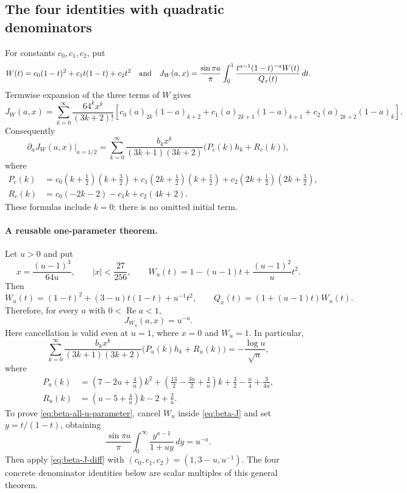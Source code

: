 \documentclass[11pt,a4paper]{article}
\theoremstyle{remark}\newtheorem{remark}[theorem]{Remark}
\numberwithin{equation}{section}
\begin{document}
\subsection{The four identities with quadratic denominators}
For constants $c_0,c_1,c_2$, put
\begin{equation}
 W(t)=c_0(1-t)^2+c_1t(1-t)+c_2t^2
 \quad\hbox{and}\quad
 J_W(a,x)=\frac{\sin\pi a}{\pi}
 \int_0^1\frac{t^{a-1}(1-t)^{-a}W(t)}{Q_x(t)}\,dt.
 \label{eq:beta-J}
\end{equation}
Termwise expansion of the three terms of $W$ gives
\begin{equation}
 J_W(a,x)=\sum_{k=0}^{\infty}\frac{64^kx^k}{(3k+2)!}
 \left[c_0(a)_{2k}(1-a)_{k+2}
 +c_1(a)_{2k+1}(1-a)_{k+1}
 +c_2(a)_{2k+2}(1-a)_k\right].
 \label{eq:beta-J-series}
\end{equation}
Consequently
\begin{equation}
 \left.\partial_aJ_W(a,x)\right|_{a=1/2}
 =\sum_{k=0}^{\infty}\frac{b_kx^k}{(3k+1)(3k+2)}
 \bigl(P_c(k)h_k+R_c(k)\bigr),
 \label{eq:beta-J-diff}
\end{equation}
where
\begin{align}
 P_c(k)&=c_0(k+\tfrac12)(k+\tfrac32)
 +c_1(2k+\tfrac12)(k+\tfrac12)
 +c_2(2k+\tfrac12)(2k+\tfrac32),\\
 R_c(k)&=c_0(-2k-2)-c_1k+c_2(4k+2).
\end{align}
These formulas include $k=0$: there is no omitted initial term.

\paragraph{A reusable one-parameter theorem.}
Let $u>0$ and put
\[
 x=\frac{(u-1)^3}{64u},\qquad |x|<\frac{27}{256},\qquad
 W_u(t)=1-(u-1)t+\frac{(u-1)^2}{u}t^2.
\]
Then
\[
 W_u(t)=(1-t)^2+(3-u)t(1-t)+u^{-1}t^2,
 \qquad Q_x(t)=(1+(u-1)t)W_u(t).
\]
Therefore, for every $a$ with $0<\operatorname{Re}a<1$,
\begin{equation}
 J_{W_u}(a,x)=u^{-a}.\label{eq:beta-all-u-parameter}
\end{equation}
Here cancellation is valid even at $u=1$, where $x=0$ and $W_u=1$.
In particular,
\begin{equation}
 \sum_{k=0}^\infty\frac{b_kx^k}
 {(3k+1)(3k+2)}\bigl(P_u(k)h_k+R_u(k)\bigr)
 =-\frac{\log u}{\sqrt u},\label{eq:beta-all-u-harmonic}
\end{equation}
where
\begin{align*}
 P_u(k)&=\left(7-2u+\frac4u\right)k^2
 +\left(\frac{13}2-\frac{3u}2+\frac4u\right)k
 +\frac32-\frac u4+\frac{3}{4u},\\
 R_u(k)&=\left(u-5+\frac4u\right)k-2+\frac2u.
\end{align*}
To prove \eqref{eq:beta-all-u-parameter}, cancel $W_u$ inside
\eqref{eq:beta-J} and set $y=t/(1-t)$, obtaining
\[
 \frac{\sin\pi a}{\pi}\int_0^\infty
 \frac{y^{a-1}}{1+uy}\,dy=u^{-a}.
\]
Then apply \eqref{eq:beta-J-diff} with
$(c_0,c_1,c_2)=(1,3-u,u^{-1})$.
The four concrete denominator identities below are scalar multiples
of this general theorem.
\end{document}

